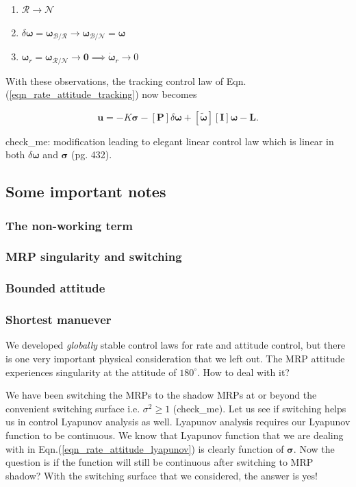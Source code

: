 \documentclass{article}
\begin{document}
\begin{enumerate}
  \item $\mathcal{R}\rightarrow\mathcal{N}$
  \item $\delta\bm{\omega}= \bm{\omega}_{\mathcal{B}/\mathcal{R}}\rightarrow\bm{\omega}_{\mathcal{B}/\mathcal{N}}=\bm{\omega}$
  \item $\bm{\omega}_{r}=\bm{\omega}_{\mathcal{R}/\mathcal{N}}\rightarrow\bm{0}\implies\dot{\bm{\omega}}_{r}\rightarrow0$
\end{enumerate}

With these observations, the tracking control law of Eqn.(\ref{eqn_rate_attitude_tracking}) now becomes

\begin{equation}
  \label{eqn_rate_attitude_regulation}
  \bm{u}=-K\bm{\sigma}-[\bm{P}]\delta\bm{\omega}+[\tilde{\bm{\omega}}][\bm{I}]\bm{\omega}-\bm{L}.
\end{equation}

check\_me: modification leading to elegant linear control law which is linear in both $\delta\bm{\omega}$ and $\bm{\sigma}$ (pg. 432). 

\subsection{Some important notes}
\subsubsection{The non-working term}
\subsubsection{MRP singularity and switching}
\subsubsection{Bounded attitude}
\subsubsection{Shortest manuever}

We developed \textit{globally} stable control laws for rate and attitude control, but there is one very important physical consideration that we left out. The MRP attitude experiences singularity at the attitude of $180^{\circ}$. How to deal with it?

We have been switching the MRPs to the shadow MRPs at or beyond the convenient switching surface i.e. $\sigma^{2}\geq1$ (check\_me). Let us see if switching helps us in control Lyapunov analysis as well. Lyapunov analysis requires our Lyapunov function to be continuous. We know that Lyapunov function that we are dealing with in Eqn.(\ref{eqn_rate_attitude_lyapunov}) is clearly function of $\bm{\sigma}$. Now the question is if the function will still be continuous after switching to MRP shadow? With the switching surface that we considered, the answer is yes!
\end{document}
